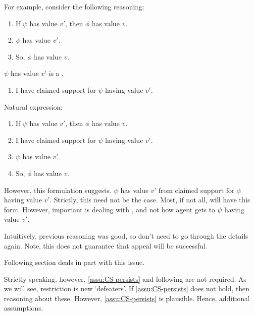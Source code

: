 \begin{note}
  For example, consider the following reasoning:

  \begin{enumerate}
  \item If \(\psi\) has value \(v'\), then \(\phi\) has value \(v\).
  \item \(\psi\) has value \(v'\).
  \item So, \(\phi\) has value \(v\).
  \end{enumerate}

  \(\psi\) has value \(v'\) is a \requ{}.

  \begin{enumerate}
  \item I have claimed support for \(\psi\) having value \(v'\).
  \end{enumerate}

  Natural expression:

  \begin{enumerate}
  \item If \(\psi\) has value \(v'\), then \(\phi\) has value \(v\).
  \item I have claimed support for \(\psi\) having value \(v'\).
  \item \(\psi\) has value \(v'\)
  \item So, \(\phi\) has value \(v\).
  \end{enumerate}

  However, this formulation suggests.
  \(\psi\) has value \(v'\) from claimed support for \(\psi\) having value \(v'\).
  Strictly, this need not be the case.
  Most, if not all,  will have this form.
  However, important is dealing with \requ{}, and not how agent gets to \(\psi\) having value \(v'\).
\end{note}

\begin{note}
  Intuitively, previous reasoning was good, so don't need to go through the details again.
  Note, this does not guarantee that appeal will be successful.

  Following section deals in part with this issue.
\end{note}

\begin{note}
  Strictly speaking, however, \autoref{assu:CS-persists} and following are not required.
  As we will see, restriction is new `defeaters'.
  If \autoref{assu:CS-persists} does not hold, then reasoning about these.
  However, \autoref{assu:CS-persists} is plausible.
  Hence, additional assumptions.
\end{note}



